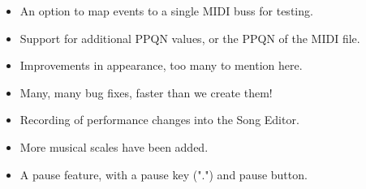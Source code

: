 \documentclass[
 11pt,
 twoside,
 a4paper,
 headinclude,
 footinclude,
 final                                 %
]{article}
\begin{document}
\begin{itemize}
      \item An option to map events to a single MIDI buss for testing.
      \item Support for additional PPQN values, or the PPQN of the MIDI file.
      \item Improvements in appearance, too many to mention here.
      \item Many, many bug fixes, faster than we create them!
      \item Recording of performance changes into the Song Editor.
      \item More musical scales
         have been added.
      \item A pause feature, with a pause key (".") and pause button.

\end{itemize}
\end{document}
